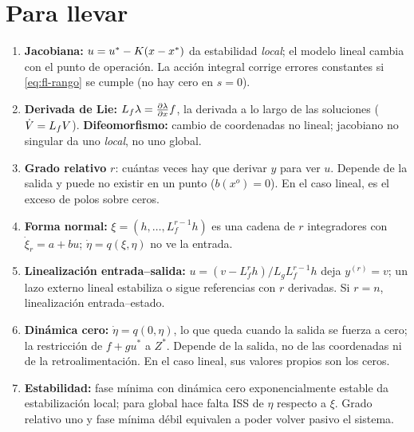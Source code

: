 \section{Para llevar}
\label{sec:fl-cierre}

\begin{parallevar}
\begin{enumerate}
  \item \textbf{Jacobiana:} $u=u^*-K(x-x^{*})$ da estabilidad \emph{local}; el modelo lineal cambia con el punto de operación. La acción integral corrige errores constantes si \eqref{eq:fl-rango} se cumple (no hay cero en $s=0$).
  \item \textbf{Derivada de Lie:} $L_f\lambda=\frac{\partial \lambda}{\partial x}f$, la derivada a lo largo de las soluciones ($\dot V=L_fV$). \textbf{Difeomorfismo:} cambio de coordenadas no lineal; jacobiano no singular da uno \emph{local}, no uno global.
  \item \textbf{Grado relativo} $r$: cuántas veces hay que derivar $y$ para ver $u$. Depende de la salida y puede no existir en un punto ($b(x^o)=0$). En el caso lineal, es el exceso de polos sobre ceros.
  \item \textbf{Forma normal:} $\xi=(h,\dots,L_f^{r-1}h)$ es una cadena de $r$ integradores con $\dot\xi_r=a+bu$; $\dot\eta=q(\xi,\eta)$ no ve la entrada.
  \item \textbf{Linealización entrada--salida:} $u=(v-L_f^rh)/L_gL_f^{r-1}h$ deja $y^{(r)}=v$; un lazo externo lineal estabiliza o sigue referencias con $r$ derivadas. Si $r=n$, linealización entrada--estado.
  \item \textbf{Dinámica cero:} $\dot\eta=q(0,\eta)$, lo que queda cuando la salida se fuerza a cero; la restricción de $f+gu^*$ a $Z^*$. Depende de la salida, no de las coordenadas ni de la retroalimentación. En el caso lineal, sus valores propios son los ceros.
  \item \textbf{Estabilidad:} fase mínima con dinámica cero exponencialmente estable da estabilización local; para global hace falta ISS de $\eta$ respecto a $\xi$. Grado relativo uno y fase mínima débil equivalen a poder volver pasivo el sistema.
\end{enumerate}
\end{parallevar}

